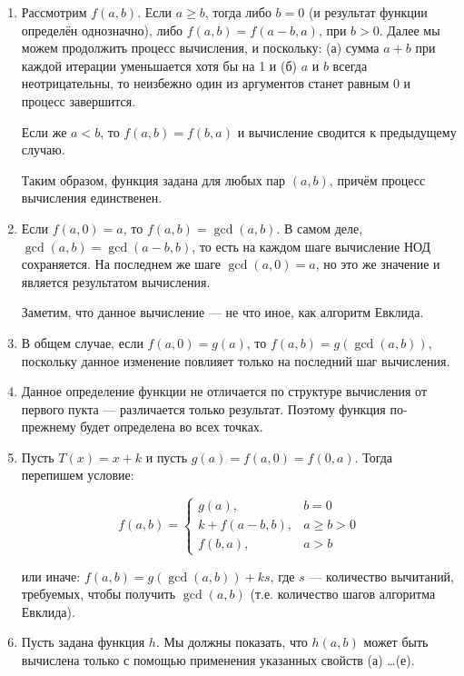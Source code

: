 
\begin{enumerate}
\item Рассмотрим $f(a,b)$. Если $a \ge b$, тогда либо $b = 0$ (и результат функции определён однозначно),
либо $f(a,b) = f(a-b,a)$, при $b > 0$. Далее мы можем продолжить процесс вычисления, и поскольку:
(а) сумма $a+b$ при каждой итерации уменьшается хотя бы на 1 и (б) $a$ и $b$ всегда неотрицательны, 
то неизбежно один из аргументов станет равным $0$ и процесс завершится. 

Если же $a < b$, то $f(a,b) = f(b,a)$ и вычисление сводится к предыдущему случаю.

Таким образом, функция задана для любых пар $(a,b)$, причём процесс вычисления единственен.

\item Если $f(a,0) = a$, то $f(a,b) = \gcd(a,b)$.
В самом деле, $\gcd(a,b) = \gcd(a-b,b)$, то есть на каждом шаге вычисление НОД сохраняется.
На последнем же шаге $\gcd(a,0) = a$, но это же значение и является результатом вычисления.

Заметим, что данное вычисление --- не что иное, как алгоритм Евклида.

\item В общем случае, если $f(a,0) = g(a)$, то $f(a,b) = g(\gcd(a,b))$, поскольку данное 
изменение повлияет только на последний шаг вычисления.

\item Данное определение функции не отличается по структуре вычисления от первого пукта ---
различается только результат. Поэтому функция по-прежнему будет определена во всех точках.

\item Пусть $T(x) = x + k$ и пусть $g(a) = f(a,0) = f(0,a)$. Тогда перепишем условие:

$$f(a,b) = \left\{\begin{array}{ll}
   g(a), & b = 0\\
   k+f(a-b,b), & a \ge b > 0\\
   f(b,a), & a > b\end{array}\right.$$

или иначе: $f(a,b) = g(\gcd(a,b)) + ks$, где $s$ --- количество вычитаний, требуемых,
чтобы получить $\gcd(a,b)$ (т.е. количество шагов алгоритма Евклида). 

\item Пусть задана функция $h$. Мы должны показать, что $h(a,b)$ может быть вычислена 
только с помощью применения указанных свойств (а) \dots (е).


\end{enumerate}
